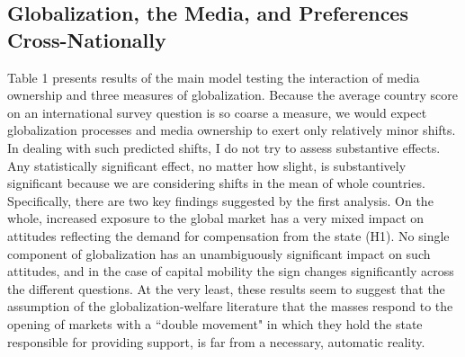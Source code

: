 \documentclass[12pt]{report}
\begin{document}
\subsection{Globalization, the Media, and Preferences Cross-Nationally}

Table 1 presents results of the main model testing the interaction of media ownership and three
measures of globalization. Because the average country score on an international survey question is
so coarse a measure, we would expect globalization processes and media ownership to exert only
relatively minor shifts. In dealing with such predicted shifts, I do not try to assess substantive
effects. Any statistically significant effect, no matter how slight, is substantively significant
because we are considering shifts in the mean of whole countries. Specifically, there are two key
findings suggested by the first analysis. On the whole, increased exposure to the global market has
a very mixed impact on attitudes reflecting the demand for compensation from the state (H1). No
single component of globalization has an unambiguously significant impact on such attitudes, and in
the case of capital mobility the sign changes significantly across the different questions. At the
very least, these results seem to suggest that the assumption of the globalization-welfare
literature that the masses respond to the opening of markets with a ``double movement" in which they
hold the state responsible for providing support, is far from a necessary, automatic reality.
\end{document}
